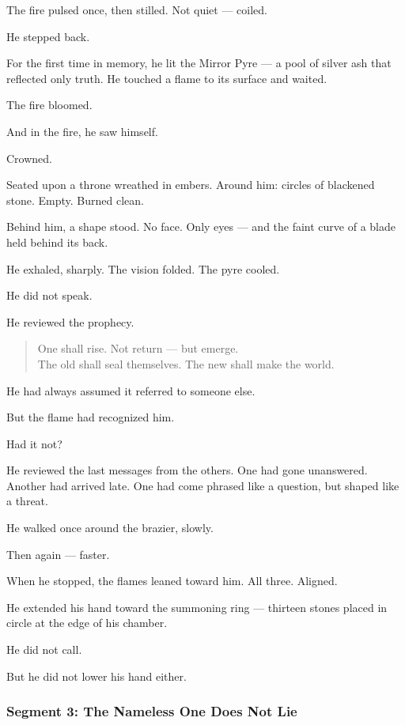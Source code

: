 \documentclass[9pt]{article}
\begin{document}
The fire pulsed once, then stilled. Not quiet — coiled.

He stepped back.

For the first time in memory, he lit the Mirror Pyre — a pool of silver ash that reflected only truth. He touched a flame to its surface and waited.

The fire bloomed.

And in the fire, he saw himself.

Crowned.

Seated upon a throne wreathed in embers. Around him: circles of blackened stone. Empty. Burned clean.

Behind him, a shape stood. No face. Only eyes — and the faint curve of a blade held behind its back.

He exhaled, sharply. The vision folded. The pyre cooled.

He did not speak.

He reviewed the prophecy.

\begin{quote}
One shall rise. Not return — but emerge.\\
The old shall seal themselves. The new shall make the world.
\end{quote}

He had always assumed it referred to someone else.

But the flame had recognized him.

Had it not?

He reviewed the last messages from the others. One had gone unanswered. Another had arrived late. One had come phrased like a question, but shaped like a threat.

He walked once around the brazier, slowly.

Then again — faster.

When he stopped, the flames leaned toward him. All three. Aligned.

He extended his hand toward the summoning ring — thirteen stones placed in circle at the edge of his chamber.

He did not call.

But he did not lower his hand either.


\newpage

\subsubsection*{Segment 3: The Nameless One Does Not Lie}
\end{document}
